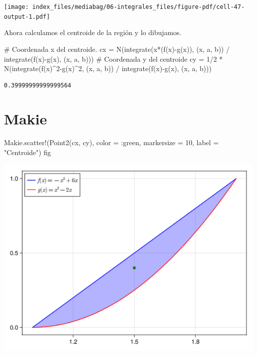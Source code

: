 \documentclass[
  a4paper,
]{scrreport}
\newenvironment{Shaded}{\begin{snugshade}}{\end{snugshade}}
\newcommand{\CommentTok}[1]{\textcolor[rgb]{0.37,0.37,0.37}{#1}}
\newcommand{\FloatTok}[1]{\textcolor[rgb]{0.68,0.00,0.00}{#1}}
\newcommand{\FunctionTok}[1]{\textcolor[rgb]{0.28,0.35,0.67}{#1}}
\newcommand{\NormalTok}[1]{\textcolor[rgb]{0.00,0.23,0.31}{#1}}
\newcommand{\OperatorTok}[1]{\textcolor[rgb]{0.37,0.37,0.37}{#1}}
\newcommand{\StringTok}[1]{\textcolor[rgb]{0.13,0.47,0.30}{#1}}
\theoremstyle{definition}
\theoremstyle{remark}
\begin{document}
\begin{tcolorbox}
\texttt{[image: index\_files/mediabag/06-integrales\_files/figure-pdf/cell-47-output-1.pdf]}

Ahora calculamos el centroide de la región y lo dibujamos.

\begin{Shaded}
\begin{Highlighting}[]
\CommentTok{\# Coordenada x del centroide.}
\NormalTok{cx }\OperatorTok{=} \FunctionTok{N}\NormalTok{(}\FunctionTok{integrate}\NormalTok{(}\FunctionTok{x*}\NormalTok{(}\FunctionTok{f}\NormalTok{(x)}\FunctionTok{{-}g}\NormalTok{(x)), (x, a, b)) }\OperatorTok{/} \FunctionTok{integrate}\NormalTok{(}\FunctionTok{f}\NormalTok{(x)}\FunctionTok{{-}g}\NormalTok{(x), (x, a, b)))}
\CommentTok{\# Coordenada y del centroide}
\NormalTok{cy }\OperatorTok{=} \FloatTok{1}\OperatorTok{/}\FloatTok{2} \OperatorTok{*} \FunctionTok{N}\NormalTok{(}\FunctionTok{integrate}\NormalTok{(}\FunctionTok{f}\NormalTok{(x)}\OperatorTok{\^{}}\FloatTok{2}\FunctionTok{{-}g}\NormalTok{(x)}\OperatorTok{\^{}}\FloatTok{2}\NormalTok{, (x, a, b)) }\OperatorTok{/} \FunctionTok{integrate}\NormalTok{(}\FunctionTok{f}\NormalTok{(x)}\FunctionTok{{-}g}\NormalTok{(x), (x, a, b)))}
\end{Highlighting}
\end{Shaded}

\begin{verbatim}
0.39999999999999564
\end{verbatim}

\section{Makie}

\begin{Shaded}
\begin{Highlighting}[]
\NormalTok{Makie.}\FunctionTok{scatter!}\NormalTok{(}\FunctionTok{Point2}\NormalTok{(cx, cy), color }\OperatorTok{=} \OperatorTok{:}\NormalTok{green, markersize }\OperatorTok{=} \FloatTok{10}\NormalTok{, label }\OperatorTok{=} \StringTok{"Centroide"}\NormalTok{)}
\NormalTok{fig}
\end{Highlighting}
\end{Shaded}

\includegraphics{06-integrales_files/figure-pdf/cell-49-output-1.png}


\end{tcolorbox}
\end{document}
